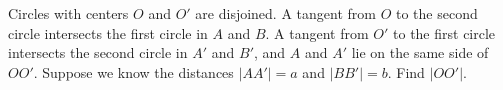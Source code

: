 Circles with centers $O$ and $O'$ are disjoined. A tangent from $O$ to the second circle intersects the first circle in $A$ and $B$. A tangent from $O'$ to the first circle intersects the second circle in $A'$ and $B'$, and $A$ and $A'$ lie on the same side of $OO'$. Suppose we know the distances $|AA'| = a$ and $|BB'| = b$. Find $|OO'|$.
